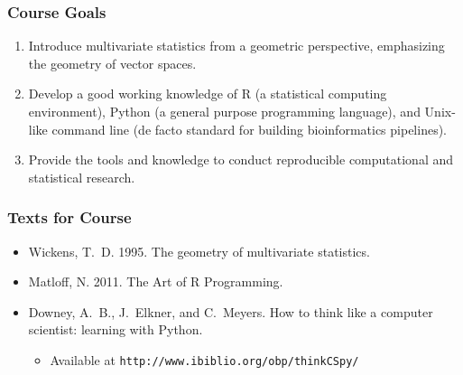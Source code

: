 \documentclass{beamer}
\begin{document}
\begin{frame}
  \frametitle{Course Goals}

\begin{enumerate}

\item Introduce multivariate statistics from a geometric perspective, emphasizing the geometry of vector spaces.

\item Develop a good working knowledge of R (a statistical computing environment), Python (a general purpose programming language), and Unix-like command line (de facto standard for building bioinformatics pipelines).

\item Provide the tools and knowledge to conduct reproducible computational and statistical research.


\end{enumerate}

\end{frame}




\begin{frame}
  \frametitle{Texts for Course}

\begin{itemize}

\item Wickens, T.\ D. 1995. The geometry of multivariate statistics.

\item Matloff, N. 2011. The Art of R Programming.

\item Downey, A.\ B., J.\ Elkner, and C.\ Meyers. How to think like a computer scientist: learning with Python.
\begin{itemize}
	\item Available at \texttt{http://www.ibiblio.org/obp/thinkCSpy/}
\end{itemize}


\end{itemize}

\end{frame}
\end{document}
